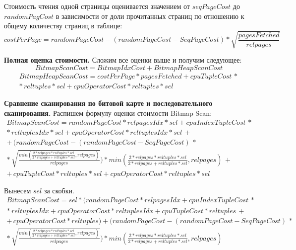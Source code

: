 Стоимость чтения одной страницы оценивается значением от $seqPageCost$ до $randomPagCost$ в зависимости от доли прочитанных страниц по отношению к общему количеству страниц в таблице:
\begin{equation}
    costPerPage = randomPageCost - (randomPageCost - SeqPageCost) * \sqrt{\frac{pagesFetched}{relpages}}
\end{equation}

\textbf{Полная оценка стоимости.} Сложим все оценки выше и получим следующее:
\begin{equation}
    BitmapScanCost = BitmapIdxCost + BitmapHeapScanCost
\end{equation}
\begin{equation}
\begin{array}{c}
 BitmapHeapScanCost = costPerPage * pagesFetched + cpuTupleCost \, * \\ 
    * \,reltuples * sel + cpuOperatorCost * reltuples * sel
\end{array}
\end{equation}

\textbf{Сравнение сканирования по битовой карте и последовательного сканирования.} Распишем формулу оценки стоимости Bitmap Scan:
\begin{equation}
\begin{array}{c}
BitmapScanCost = randomPageCost * relpagesIdx * sel + cpuIndexTupleCost \, * \\
* \, reltuplesIdx * sel + cpuOperatorCost * reltuplesIdx * sel \, + \\
+ \, (randomPageCost - (randomPageCost - SeqPageCost) \, * \\ * \, \sqrt{\frac{min(\frac{2*relpages*reltuples*sel}{2*relpages+reltuples*sel}, relpages)}{relpages}}) * min(\frac{2*relpages*reltuples*sel}{2*relpages+reltuples*sel}, relpages) \, + \\ 
+ \, cpuTupleCost * reltuples * sel + cpuOperatorCost * reltuples * sel
\end{array}
\end{equation}

Вынесем $sel$ за скобки. 
\begin{equation}
\begin{array}{c}
   BitmapScanCost = sel * (randomPageCost * relpagesIdx + cpuIndexTupleCost \, * \\
    * \, reltuplesIdx + cpuOperatorCost * reltuplesIdx + cpuTupleCost * reltuples \, + \\
    + \, cpuOperatorCost * reltuples) + (randomPageCost - (randomPageCost - SeqPageCost) \, * \\ * \, \sqrt{\frac{min(\frac{2*relpages*reltuples*sel}{2*relpages+reltuples*sel}, relpages)}{relpages}}) * min(\frac{2*relpages*reltuples*sel}{2*relpages+reltuples*sel}, relpages)
\end{array}
\end{equation}

